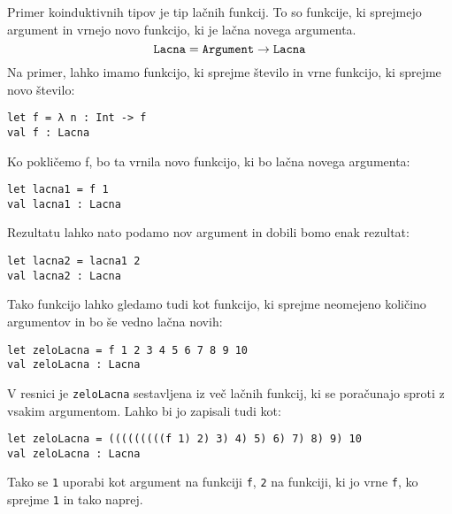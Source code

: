 \documentclass[12pt,a4paper,openany]{book}
\begin{document}
Primer koinduktivnih tipov je tip lačnih funkcij. To so funkcije, ki sprejmejo argument in vrnejo novo funkcijo, ki je lačna novega argumenta.
\begin{equation}
    \mathtt{Lacna} = \mathtt{Argument} \rightarrow \mathtt{Lacna} \notag
\end{equation}
Na primer, lahko imamo funkcijo, ki sprejme število in vrne funkcijo, ki sprejme novo število:
\begin{lstlisting}
let f = λ n : Int -> f
val f : Lacna  
\end{lstlisting}
Ko pokličemo f, bo ta vrnila novo funkcijo, ki bo lačna novega argumenta:
\begin{lstlisting}
let lacna1 = f 1
val lacna1 : Lacna
\end{lstlisting}
Rezultatu lahko nato podamo nov argument in dobili bomo enak rezultat:
\begin{lstlisting}
let lacna2 = lacna1 2
val lacna2 : Lacna  
\end{lstlisting}
Tako funkcijo lahko gledamo tudi kot funkcijo, ki sprejme neomejeno količino argumentov in bo še vedno lačna novih:
\begin{lstlisting}
let zeloLacna = f 1 2 3 4 5 6 7 8 9 10
val zeloLacna : Lacna
\end{lstlisting}
V resnici je \lstinline{zeloLacna} sestavljena iz več lačnih funkcij, ki se poračunajo sproti z vsakim argumentom. Lahko bi jo zapisali tudi kot:
\begin{lstlisting}
let zeloLacna = (((((((((f 1) 2) 3) 4) 5) 6) 7) 8) 9) 10
val zeloLacna : Lacna
\end{lstlisting}
Tako se \lstinline{1} uporabi kot argument na funkciji \lstinline{f}, \lstinline{2} na funkciji, ki jo vrne \lstinline{f}, ko sprejme \lstinline{1} in tako naprej.
\end{document}
